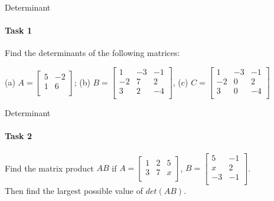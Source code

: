 \documentclass[aspectratio=169,notes]{beamer}
\begin{document}
\begin{frame}[t]{Determinant}
\framesubtitle{Task 1}
Find the determinants of the following matrices:

(a) $A=\begin{bmatrix}
          5 & -2 \\
          1 & 6 \\
        \end{bmatrix}$;
(b) $B=\begin{bmatrix}
           1 & -3 & -1 \\
           -2 & 7 & 2 \\
           3 & 2 & -4 \\
         \end{bmatrix}$,
(c) $C=\begin{bmatrix}
    1 & -3 & -1 \\
    -2 & 0 & 2 \\
    3 & 0 & -4 \\
  \end{bmatrix}$
\end{frame}

\begin{frame}[t]{Determinant}
\framesubtitle{Task 2}
Find the matrix product $AB$ if $A=\begin{bmatrix}
    1 & 2 & 5 \\
    3 & 7 & x \\
  \end{bmatrix}$, $B=\begin{bmatrix}
     5 & -1 \\
     x & 2 \\
     -3 & -1 \\
   \end{bmatrix}$.\\ Then find the largest possible value of $det(AB)$.
\end{frame}
\end{document}
